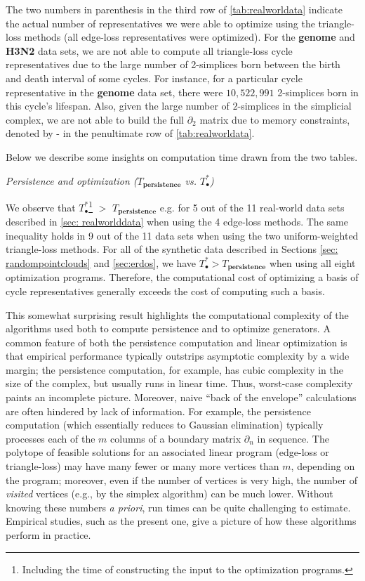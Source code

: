 The two numbers in parenthesis in the third row of \tab \ref{tab:realworldata} indicate the actual number of representatives we were able to optimize using the triangle-loss methods (all edge-loss representatives were optimized). For the \textbf{genome} and \textbf{H3N2} data sets, we are not able to compute all triangle-loss cycle representatives due to the large number of 2-simplices born between the birth and death interval of some cycles. For instance, for a particular cycle representative in the \textbf{genome} data set, there were $10{,}522{,}991$ 2-simplices born in this cycle's lifespan. 
Also, given the large number of $2$-simplices in the simplicial complex, we are not able to build the full $\partial_2$ matrix due to memory constraints, denoted by - in the penultimate row of \tab \ref{tab:realworldata}. 

Below we describe some insights on computation time drawn from the two tables. 

 

\noindent \emph{Persistence and optimization ($T_\textbf{persistence}$ vs. $T_\bullet^*$)}

We observe that $T_\bullet^*$\footnote{Including the time of constructing the input to the optimization programs.} $>$ $T_\textbf{persistence}$  e.g. for 5 out of the 11 real-world data sets described in \se \ref{sec: realworlddata} when using the 4 edge-loss methods.  The same inequality holds in 9 out of the 11 data sets when using the two uniform-weighted triangle-loss methods. For all of the synthetic data described in Sections \ref{sec: randompointclouds} and \ref{sec:erdos}, we have $T_\bullet^* > T_\textbf{persistence}$  when using all eight optimization programs. Therefore, the computational cost of optimizing a basis of cycle representatives generally exceeds the cost of computing such a basis.

This somewhat surprising result highlights the computational complexity of the algorithms used both to compute persistence and to optimize generators.  A common feature of both the persistence computation and linear optimization is that empirical performance  typically outstrips asymptotic complexity by a wide margin; the persistence computation, for example, has cubic complexity in the size of the complex, but usually runs in linear time.  Thus, worst-case complexity paints an incomplete picture.   Moreover, naive ``back of the envelope'' calculations are often hindered by lack of information.  For example, the persistence computation (which essentially reduces to Gaussian elimination) typically processes each of the $m$ columns of a boundary matrix $\partial_n$ in sequence. The polytope of feasible solutions for an associated linear program (edge-loss or triangle-loss) may have many fewer or many more vertices than $m$, depending on the program; moreover, even if the number of vertices is very high, the number of \emph{visited} vertices (e.g., by the simplex algorithm) can be much lower.  Without knowing these numbers \emph{a priori}, run times can be quite challenging to estimate. Empirical studies, such as the present one, give a picture of how these algorithms perform in practice.

